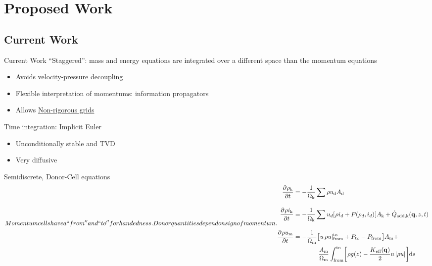 \documentclass[10pt,t,xcolor=table]{beamer}
\newenvironment{Itemize}
    {\begin{itemize}\setlength{\itemsep}{0.8em}\setlength{\leftmargin}{0.0em}\setlength{\labelwidth}{0em}}
    {\end{itemize}}
\begin{document}
    
\section{Proposed Work}

    \subsection*{Current Work}
    \begin{frame}[label=NonrigorMain]{Current Work}
        ``Staggered'': mass and energy equations are integrated over a different space than the momentum equations
        \begin{Itemize}
            \item{Avoids velocity-pressure decoupling}
            \item{Flexible interpretation of momentums: information propagators}
            \item{Allows \hyperlink{Nonrigor}{Non-rigorous grids}}
        \end{Itemize}
        
        \vspace{2em}
        Time integration: Implicit Euler
        \begin{Itemize}
            \item{Unconditionally stable and TVD}
            \item{Very diffusive}
        \end{Itemize}
    \end{frame}

    \begin{frame}{Semidiscrete, Donor-Cell equations}
        \begin{subequations}\label{Eqn:Semidiscrete1}
            Momentum cells have a ``from'' and ``to'' for handedness.
            Donor quantities depend on sign of momentum.
            
            \begin{align}
                \pdiff{\rho\subs{k}}{t}  &= - \oneo{\CVvol}\sum{\rhou\subs{d} A\subs{d}}\\[1em]
                \pdiff{\rhoi\subs{k}}{t} &= - \oneo{\CVvol}\sum{u_d\left[\rhoi_d  + P(\rho_d,i_d)\right] A\subs{k}} + \dot{Q}\subs{add,k}(\qCon,z,t) \\[1em]
                \pdiff{\rhou\subs{m}}{t} &= - \oneo{\MCvol}\left[u\,\rhou\rvert^\text{to}_\text{from} + P_\text{to} - P_\text{from}\right]A\subs{m} + \\
                                         &  \qquad\qquad  \frac{A\subs{m}}{\MCvol}
                                               \int_{\text{from}}^{\text{to}}\left[\rho{g(z)} - \frac{\Keff(\qCon)}{2} u\,|\rhou|\right] \mathrm{d}s \notag
            \end{align}
        \end{subequations}
    \end{frame}
\end{document}
